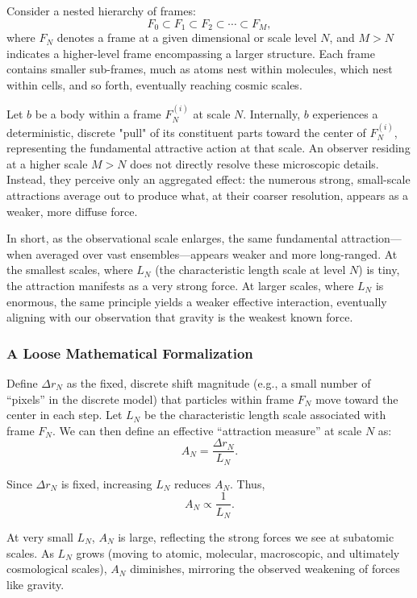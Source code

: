 \documentclass{article}
\begin{document}
Consider a nested hierarchy of frames:
\[
F_0 \subset F_1 \subset F_2 \subset \cdots \subset F_M,
\]
where $F_N$ denotes a frame at a given dimensional or scale level $N$, and $M > N$ indicates a higher-level frame encompassing a larger structure. Each frame contains smaller sub-frames, much as atoms nest within molecules, which nest within cells, and so forth, eventually reaching cosmic scales.

Let $b$ be a body within a frame $F_N^{(i)}$ at scale $N$. Internally, $b$ experiences a deterministic, discrete "pull" of its constituent parts toward the center of $F_N^{(i)}$, representing the fundamental attractive action at that scale. An observer residing at a higher scale $M > N$ does not directly resolve these microscopic details. Instead, they perceive only an aggregated effect: the numerous strong, small-scale attractions average out to produce what, at their coarser resolution, appears as a weaker, more diffuse force.

In short, as the observational scale enlarges, the same fundamental attraction—when averaged over vast ensembles—appears weaker and more long-ranged. At the smallest scales, where $L_N$ (the characteristic length scale at level $N$) is tiny, the attraction manifests as a very strong force. At larger scales, where $L_N$ is enormous, the same principle yields a weaker effective interaction, eventually aligning with our observation that gravity is the weakest known force.

\subsubsection*{A Loose Mathematical Formalization}

Define $\Delta r_N$ as the fixed, discrete shift magnitude (e.g., a small number of “pixels” in the discrete model) that particles within frame $F_N$ move toward the center in each step. Let $L_N$ be the characteristic length scale associated with frame $F_N$. We can then define an effective “attraction measure” at scale $N$ as:
\[
A_N = \frac{\Delta r_N}{L_N}.
\]

Since $\Delta r_N$ is fixed, increasing $L_N$ reduces $A_N$. Thus,
\[
A_N \propto \frac{1}{L_N}.
\]

At very small $L_N$, $A_N$ is large, reflecting the strong forces we see at subatomic scales. As $L_N$ grows (moving to atomic, molecular, macroscopic, and ultimately cosmological scales), $A_N$ diminishes, mirroring the observed weakening of forces like gravity.
\end{document}
